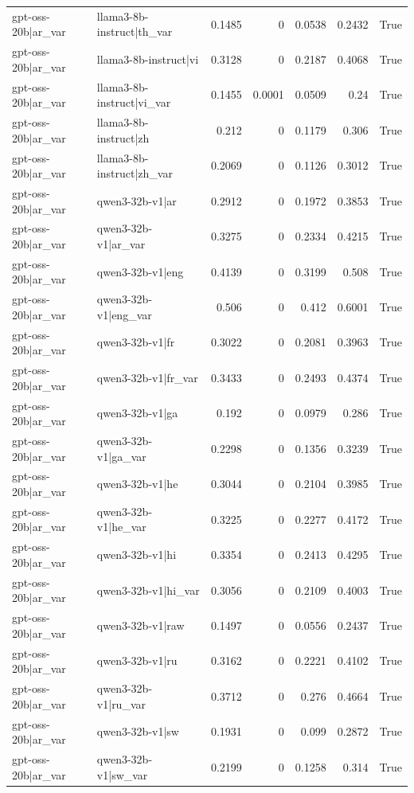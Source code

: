 \begin{table}
\begin{tabular}{l l r r r r l}
gpt-oss-20b|ar_var & llama3-8b-instruct|th_var & 0.1485 & 0 & 0.0538 & 0.2432 & True \\
gpt-oss-20b|ar_var & llama3-8b-instruct|vi & 0.3128 & 0 & 0.2187 & 0.4068 & True \\
gpt-oss-20b|ar_var & llama3-8b-instruct|vi_var & 0.1455 & 0.0001 & 0.0509 & 0.24 & True \\
gpt-oss-20b|ar_var & llama3-8b-instruct|zh & 0.212 & 0 & 0.1179 & 0.306 & True \\
gpt-oss-20b|ar_var & llama3-8b-instruct|zh_var & 0.2069 & 0 & 0.1126 & 0.3012 & True \\
gpt-oss-20b|ar_var & qwen3-32b-v1|ar & 0.2912 & 0 & 0.1972 & 0.3853 & True \\
gpt-oss-20b|ar_var & qwen3-32b-v1|ar_var & 0.3275 & 0 & 0.2334 & 0.4215 & True \\
gpt-oss-20b|ar_var & qwen3-32b-v1|eng & 0.4139 & 0 & 0.3199 & 0.508 & True \\
gpt-oss-20b|ar_var & qwen3-32b-v1|eng_var & 0.506 & 0 & 0.412 & 0.6001 & True \\
gpt-oss-20b|ar_var & qwen3-32b-v1|fr & 0.3022 & 0 & 0.2081 & 0.3963 & True \\
gpt-oss-20b|ar_var & qwen3-32b-v1|fr_var & 0.3433 & 0 & 0.2493 & 0.4374 & True \\
gpt-oss-20b|ar_var & qwen3-32b-v1|ga & 0.192 & 0 & 0.0979 & 0.286 & True \\
gpt-oss-20b|ar_var & qwen3-32b-v1|ga_var & 0.2298 & 0 & 0.1356 & 0.3239 & True \\
gpt-oss-20b|ar_var & qwen3-32b-v1|he & 0.3044 & 0 & 0.2104 & 0.3985 & True \\
gpt-oss-20b|ar_var & qwen3-32b-v1|he_var & 0.3225 & 0 & 0.2277 & 0.4172 & True \\
gpt-oss-20b|ar_var & qwen3-32b-v1|hi & 0.3354 & 0 & 0.2413 & 0.4295 & True \\
gpt-oss-20b|ar_var & qwen3-32b-v1|hi_var & 0.3056 & 0 & 0.2109 & 0.4003 & True \\
gpt-oss-20b|ar_var & qwen3-32b-v1|raw & 0.1497 & 0 & 0.0556 & 0.2437 & True \\
gpt-oss-20b|ar_var & qwen3-32b-v1|ru & 0.3162 & 0 & 0.2221 & 0.4102 & True \\
gpt-oss-20b|ar_var & qwen3-32b-v1|ru_var & 0.3712 & 0 & 0.276 & 0.4664 & True \\
gpt-oss-20b|ar_var & qwen3-32b-v1|sw & 0.1931 & 0 & 0.099 & 0.2872 & True \\
gpt-oss-20b|ar_var & qwen3-32b-v1|sw_var & 0.2199 & 0 & 0.1258 & 0.314 & True \\

\end{tabular}
\end{table}
